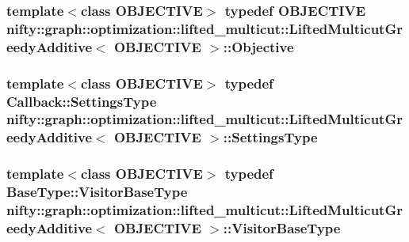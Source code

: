 \subsubsection[{Objective}]{\setlength{\rightskip}{0pt plus 5cm}template$<$class O\+B\+J\+E\+C\+T\+I\+V\+E$>$ typedef O\+B\+J\+E\+C\+T\+I\+V\+E {\bf nifty\+::graph\+::optimization\+::lifted\+\_\+multicut\+::\+Lifted\+Multicut\+Greedy\+Additive}$<$ O\+B\+J\+E\+C\+T\+I\+V\+E $>$\+::{\bf Objective}}\label{classnifty_1_1graph_1_1optimization_1_1lifted__multicut_1_1LiftedMulticutGreedyAdditive_ab91462949e43bb7acc99bf76e9199eb1}
\hypertarget{classnifty_1_1graph_1_1optimization_1_1lifted__multicut_1_1LiftedMulticutGreedyAdditive_a429990d7720121fd3832a7b32cda8732}{}
\subsubsection[{Settings\+Type}]{\setlength{\rightskip}{0pt plus 5cm}template$<$class O\+B\+J\+E\+C\+T\+I\+V\+E$>$ typedef Callback\+::\+Settings\+Type {\bf nifty\+::graph\+::optimization\+::lifted\+\_\+multicut\+::\+Lifted\+Multicut\+Greedy\+Additive}$<$ O\+B\+J\+E\+C\+T\+I\+V\+E $>$\+::{\bf Settings\+Type}}\label{classnifty_1_1graph_1_1optimization_1_1lifted__multicut_1_1LiftedMulticutGreedyAdditive_a429990d7720121fd3832a7b32cda8732}
\hypertarget{classnifty_1_1graph_1_1optimization_1_1lifted__multicut_1_1LiftedMulticutGreedyAdditive_a3620357c0df85e5305861ceb408c9bf3}{}
\subsubsection[{Visitor\+Base\+Type}]{\setlength{\rightskip}{0pt plus 5cm}template$<$class O\+B\+J\+E\+C\+T\+I\+V\+E$>$ typedef {\bf Base\+Type\+::\+Visitor\+Base\+Type} {\bf nifty\+::graph\+::optimization\+::lifted\+\_\+multicut\+::\+Lifted\+Multicut\+Greedy\+Additive}$<$ O\+B\+J\+E\+C\+T\+I\+V\+E $>$\+::{\bf Visitor\+Base\+Type}}\label{classnifty_1_1graph_1_1optimization_1_1lifted__multicut_1_1LiftedMulticutGreedyAdditive_a3620357c0df85e5305861ceb408c9bf3}


